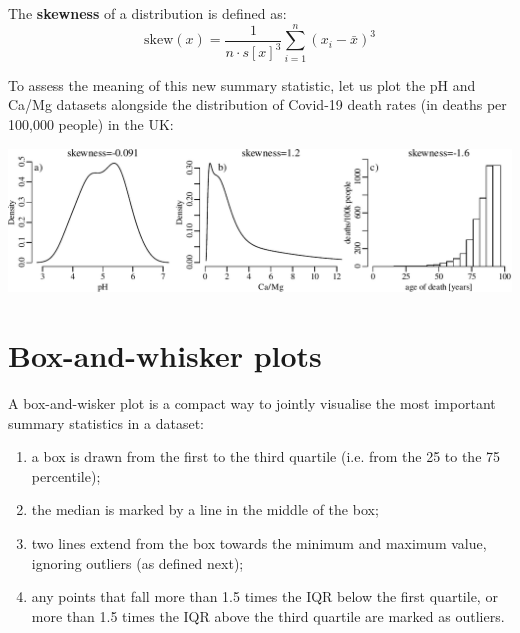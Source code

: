 The \textbf{skewness} of a distribution is defined as:
\begin{equation}
  \mbox{skew}(x) = \frac{1}{n \cdot s[x]^3}\sum\limits_{i=1}^{n}(x_i-\bar{x})^3
  \label{eq:skew}
\end{equation}

To assess the meaning of this new summary statistic, let us plot the
pH and Ca/Mg datasets alongside the distribution of Covid-19 death
rates (in deaths per 100,000 people) in the UK:\medskip

\noindent\includegraphics[width=\textwidth]{../figures/skewness.pdf}
\begingroup {} \endgroup

\section{Box-and-whisker plots}
\label{sec:boxplots}

A box-and-wisker plot is a compact way to jointly visualise the most
important summary statistics in a dataset:

\begin{enumerate}
\item a box is drawn from the first to the third quartile (i.e. from
  the 25 to the 75 percentile);
\item the median is marked by a line in the middle of the box;
\item two lines extend from the box towards the minimum and maximum
  value, ignoring outliers (as defined next);
\item any points that fall more than 1.5 times the IQR below the first
  quartile, or more than 1.5 times the IQR above the third quartile
  are marked as outliers.
\end{enumerate}

